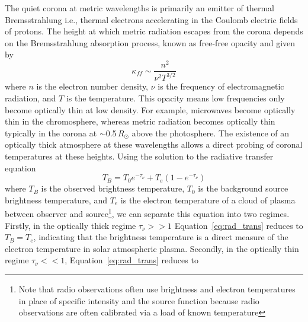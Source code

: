 The quiet corona at metric wavelengths is primarily an emitter of thermal Bremsstrahlung i.e., thermal electrons accelerating in the Coulomb electric fields of protons. The height at which metric radiation escapes from the corona depends on the Bremsstrahlung absorption process, known as free-free opacity and given by
\begin{equation}
\kappa_{ff} \sim \frac{n^2}{\nu^2T^{3/2}} 
\end{equation}
where $n$ is the electron number density, $\nu$ is the frequency of electromagnetic radiation, and $T$ is the temperature. This opacity means low frequencies only become optically thin at low density. For example, microwaves become optically thin in the chromosphere, whereas metric radiation becomes optically thin typically in the corona at $\sim$0.5$\,R_{\odot}$ above the photosphere.
The existence of an optically thick atmosphere at these wavelengths allows a direct probing of coronal temperatures at these heights. Using the solution to the radiative transfer equation
\begin{equation}
T_B = T_0e^{-\tau_{\nu}} + T_e(1-e^{-\tau_{\nu}})
\label{eq:rad_trans}
\end{equation}
where $T_B$ is the observed brightness temperature, $T_0$ is the background source brightness temperature, and $T_e$ is the electron temperature of a cloud of plasma between observer and source\footnote{Note that radio observations often use brightness and electron temperatures in place of specific intensity and the source function because radio observations are often calibrated via a load of known temperature}, we can separate this equation into two regimes. Firstly,
in the optically thick regime $\tau_{\nu}>>1$ Equation~\ref{eq:rad_trans} reduces to $T_B = T_e$, indicating that the brightness temperature is a direct measure of the electron temperature in solar atmospheric plasma. Secondly, in the optically thin regime $\tau_{\nu}<<1$, Equation~\ref{eq:rad_trans} reduces to 
